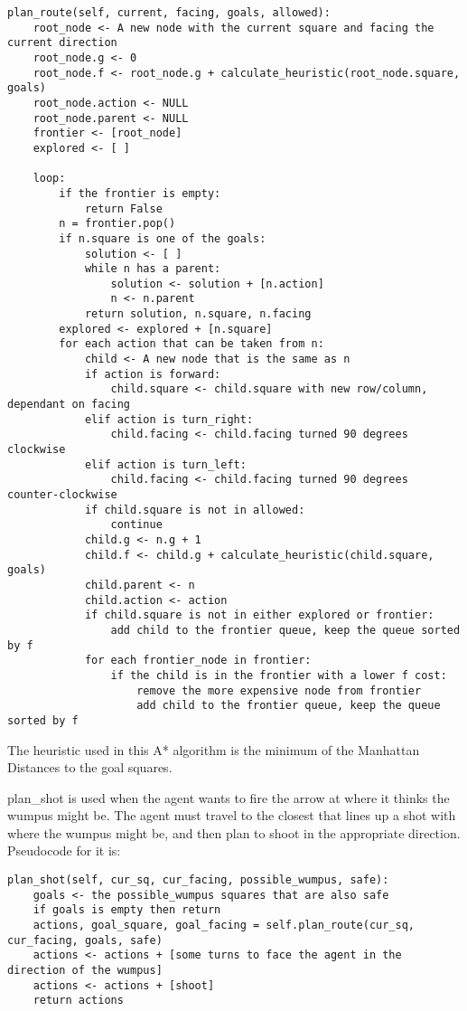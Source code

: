 \documentclass[10 pt.]{article}
\begin{document}
\begin{verbatim}
plan_route(self, current, facing, goals, allowed):
    root_node <- A new node with the current square and facing the current direction
    root_node.g <- 0
    root_node.f <- root_node.g + calculate_heuristic(root_node.square, goals)
    root_node.action <- NULL 
    root_node.parent <- NULL
    frontier <- [root_node]
    explored <- [ ]

    loop:
        if the frontier is empty:
            return False
        n = frontier.pop()
        if n.square is one of the goals:
            solution <- [ ]
            while n has a parent:
                solution <- solution + [n.action]
                n <- n.parent
            return solution, n.square, n.facing
        explored <- explored + [n.square]
        for each action that can be taken from n:
            child <- A new node that is the same as n
            if action is forward:
                child.square <- child.square with new row/column, dependant on facing
            elif action is turn_right:
                child.facing <- child.facing turned 90 degrees clockwise
            elif action is turn_left:
                child.facing <- child.facing turned 90 degrees counter-clockwise
            if child.square is not in allowed:
                continue
            child.g <- n.g + 1
            child.f <- child.g + calculate_heuristic(child.square, goals)
            child.parent <- n 
            child.action <- action
            if child.square is not in either explored or frontier:
                add child to the frontier queue, keep the queue sorted by f
            for each frontier_node in frontier:
                if the child is in the frontier with a lower f cost:
                    remove the more expensive node from frontier
                    add child to the frontier queue, keep the queue sorted by f
\end{verbatim}

The heuristic used in this A* algorithm is the minimum of the Manhattan
Distances to the goal squares.

\vspace{1 pc} plan\_shot is used when the agent wants to fire the arrow at 
where it thinks the wumpus might be. The agent must travel to the closest 
that lines up a shot with where the wumpus might be, and then plan to shoot in
the appropriate direction. Pseudocode for it is:

\begin{verbatim}
plan_shot(self, cur_sq, cur_facing, possible_wumpus, safe):
    goals <- the possible_wumpus squares that are also safe
    if goals is empty then return
    actions, goal_square, goal_facing = self.plan_route(cur_sq, cur_facing, goals, safe)
    actions <- actions + [some turns to face the agent in the direction of the wumpus]
    actions <- actions + [shoot]
    return actions
\end{verbatim}
\end{document}
